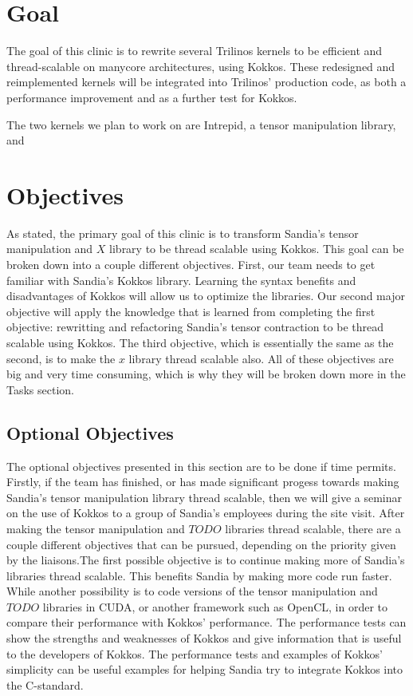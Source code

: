 \documentclass[proposal]{hmcclinic}
\begin{document}
\section{Goal}

The goal of this clinic is to rewrite several Trilinos kernels to be efficient
and thread-scalable on manycore architectures, using Kokkos.  These redesigned
and reimplemented kernels will be integrated into Trilinos' production code, as
both a performance improvement and as a further test for Kokkos.

The two kernels we plan to work on are Intrepid, a tensor manipulation library,
and

\section{Objectives}

As stated, the primary goal of this clinic is to transform Sandia's tensor manipulation and $X$ library to be thread scalable using Kokkos. 
This goal can be broken down into a couple different objectives. First, our team needs to get familiar with Sandia's Kokkos library. 
Learning the syntax benefits and disadvantages of Kokkos will allow us to optimize the libraries. 
Our second major objective will apply the knowledge that is learned from completing the first objective: rewritting and refactoring Sandia's tensor contraction to be thread scalable using Kokkos. 
The third objective, which is essentially the same as the second, is to make the $x$ library thread scalable also. All of these objectives are big and very time consuming, which is why they will be broken down more in the Tasks section.


\subsection{Optional Objectives}

The optional objectives presented in this section are to be done if time permits. Firstly, if the team has finished, or has made significant progess towards making Sandia's tensor manipulation library thread scalable, then we will give a seminar on the use of Kokkos to a group of Sandia's employees during the site visit. After making the tensor manipulation and $TODO$ libraries thread scalable, there are a couple different objectives that can be pursued, depending on the priority given by the liaisons.The first possible objective is to continue making more of Sandia's libraries thread scalable. This benefits Sandia by making more code run faster. While another possibility is to code versions of the tensor manipulation and $TODO$ libraries in CUDA, or another framework such as OpenCL, in order to compare their performance with Kokkos' performance. The performance tests can show the strengths and weaknesses of Kokkos and give information that is useful to the developers of Kokkos. The performance tests and examples of Kokkos' simplicity can be useful examples for helping Sandia try to integrate Kokkos into the C-standard.
\end{document}
